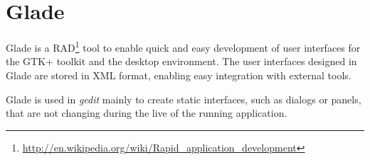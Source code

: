
\section[Glade]{Glade\cite{website:glade}}\label{sec:Glade}

Glade is a RAD\footnote{\url{http://en.wikipedia.org/wiki/Rapid_application_development}} tool to enable quick and easy development of user interfaces for the GTK+ toolkit and the \GNOME desktop environment. The user interfaces designed in Glade are stored in XML format, enabling easy integration with external tools.

Glade is used in \emph{gedit} mainly to create static interfaces, such as dialogs or panels, that are not changing during the live of the running application.
